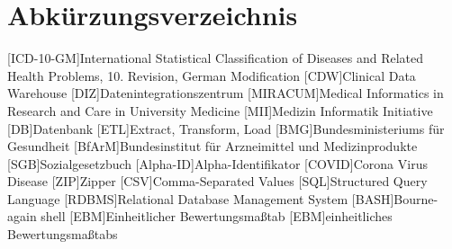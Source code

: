 \section*{Abkürzungsverzeichnis}
\begin{acronym}[acrmeta]		
	[ICD-10-GM]{International Statistical Classification of Diseases and Related Health Problems, 10. Revision, German Modification}
	[CDW]{Clinical Data Warehouse}
	[DIZ]{Datenintegrationszentrum}
	[MIRACUM]{Medical Informatics in Research and Care in University Medicine}
	[MII]{Medizin Informatik Initiative}
	[DB]{Datenbank}
	[ETL]{Extract, Transform, Load}
	[BMG]{Bundesministeriums für Gesundheit}
	[BfArM]{Bundesinstitut für Arzneimittel und Medizinprodukte}
	[SGB]{Sozialgesetzbuch}
	[Alpha-ID]{Alpha-Identifikator}
	[COVID]{Corona Virus Disease}
	[ZIP]{Zipper}
	[CSV]{Comma-Separated Values}
	[SQL]{Structured Query Language}
	[RDBMS]{Relational Database Management System}
	[BASH]{Bourne-again shell}
	[EBM]{Einheitlicher Bewertungsmaßtab}
	[EBM]{einheitliches Bewertungsmaßtabs}
	
\end{acronym}
